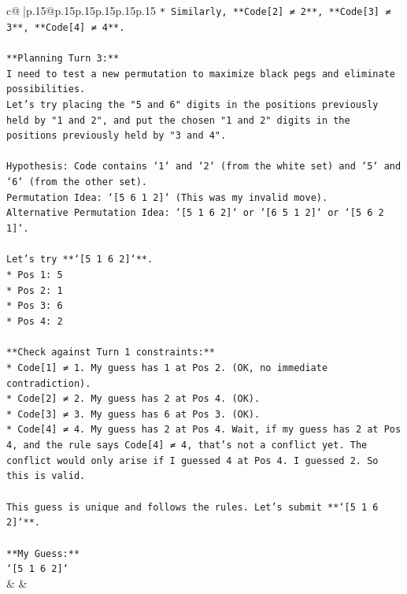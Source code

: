 \documentclass{article}
\begin{document}
{\begin{supertabular}{c@{$\;$}|p{.15\linewidth}@{}p{.15\linewidth}p{.15\linewidth}p{.15\linewidth}p{.15\linewidth}p{.15\linewidth}}
{{{\texttt{*   Similarly, **Code{[}2{]} ≠ 2**, **Code{[}3{]} ≠ 3**, **Code{[}4{]} ≠ 4**.} \\
\\ 
\texttt{**Planning Turn 3:**} \\
\texttt{I need to test a new permutation to maximize black pegs and eliminate possibilities.} \\
\texttt{Let's try placing the "5 and 6" digits in the positions previously held by "1 and 2", and put the chosen "1 and 2" digits in the positions previously held by "3 and 4".} \\
\\ 
\texttt{Hypothesis: Code contains `1` and `2` (from the white set) and `5` and `6` (from the other set).} \\
\texttt{Permutation Idea: `{[}5 6 1 2{]}` (This was my invalid move).} \\
\texttt{Alternative Permutation Idea: `{[}5 1 6 2{]}` or `{[}6 5 1 2{]}` or `{[}5 6 2 1{]}`.} \\
\\ 
\texttt{Let's try **`{[}5 1 6 2{]}`**.} \\
\texttt{*   Pos 1: 5} \\
\texttt{*   Pos 2: 1} \\
\texttt{*   Pos 3: 6} \\
\texttt{*   Pos 4: 2} \\
\\ 
\texttt{**Check against Turn 1 constraints:**} \\
\texttt{*   Code{[}1{]} ≠ 1. My guess has 1 at Pos 2. (OK, no immediate contradiction).} \\
\texttt{*   Code{[}2{]} ≠ 2. My guess has 2 at Pos 4. (OK).} \\
\texttt{*   Code{[}3{]} ≠ 3. My guess has 6 at Pos 3. (OK).} \\
\texttt{*   Code{[}4{]} ≠ 4. My guess has 2 at Pos 4. Wait, if my guess has 2 at Pos 4, and the rule says Code{[}4{]} ≠ 4, that's not a conflict yet. The conflict would only arise if I guessed 4 at Pos 4. I guessed 2. So this is valid.} \\
\\ 
\texttt{This guess is unique and follows the rules. Let's submit **`{[}5 1 6 2{]}`**.} \\
\\ 
\texttt{**My Guess:**} \\
\texttt{`{[}5 1 6 2{]}`} \\
            }
        }
    }
    & & \\ \\


\end{supertabular}}
\end{document}
